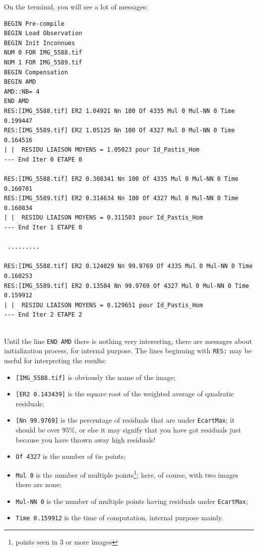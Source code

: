 On the terminal, you will see a lot of messages:

{\scriptsize
\begin{verbatim}
BEGIN Pre-compile
BEGIN Load Observation
BEGIN Init Inconnues
NUM 0 FOR IMG_5588.tif
NUM 1 FOR IMG_5589.tif
BEGIN Compensation
BEGIN AMD 
AMD::NB= 4
END AMD 
RES:[IMG_5588.tif] ER2 1.04921 Nn 100 Of 4335 Mul 0 Mul-NN 0 Time 0.199447
RES:[IMG_5589.tif] ER2 1.05125 Nn 100 Of 4327 Mul 0 Mul-NN 0 Time 0.164516
| |  RESIDU LIAISON MOYENS = 1.05023 pour Id_Pastis_Hom
--- End Iter 0 ETAPE 0

RES:[IMG_5588.tif] ER2 0.308341 Nn 100 Of 4335 Mul 0 Mul-NN 0 Time 0.160701
RES:[IMG_5589.tif] ER2 0.314634 Nn 100 Of 4327 Mul 0 Mul-NN 0 Time 0.160834
| |  RESIDU LIAISON MOYENS = 0.311503 pour Id_Pastis_Hom
--- End Iter 1 ETAPE 0

 .........

RES:[IMG_5588.tif] ER2 0.124029 Nn 99.9769 Of 4335 Mul 0 Mul-NN 0 Time 0.160253
RES:[IMG_5589.tif] ER2 0.13504 Nn 99.9769 Of 4327 Mul 0 Mul-NN 0 Time 0.159912
| |  RESIDU LIAISON MOYENS = 0.129651 pour Id_Pastis_Hom
--- End Iter 2 ETAPE 2


\end{verbatim}
}

Until the line {\tt END AMD} there is nothing very interesting, there
are messages about initialization process, for internal purpose.
The lines beginning with {\tt RES:} may be useful for interpreting the results:

\begin{itemize}
    \item {\tt [IMG\_5588.tif]} is obviously the name of the image;

    \item {\tt [ER2 0.143439]} is the square root of the weighted average of quadratic residuals;
    
    \item {\tt [Nn 99.9769]} is the percentage of residuals that are under {\tt EcartMax};
          it should be over $95\%$, or else it may signify that you have got residuals just
          because you have thrown away high residuals!

    \item {\tt Of 4327} is the number of tie points;
    \item {\tt Mul 0} is the number of multiple points\footnote{points seen in $3$ or more images};
          here, of course, with two images there are none;

    \item {\tt Mul-NN 0} is the number of multiple points having residuals under {\tt EcartMax};

        \item {\tt Time 0.159912} is the time of computation, internal purpose mainly.
\end{itemize}


